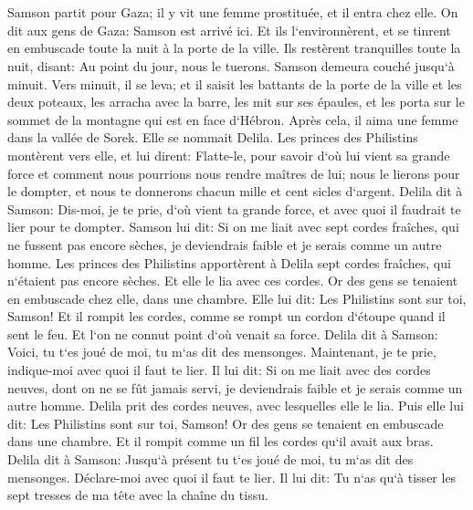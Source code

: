 \chapter{}

\verse Samson partit pour Gaza; il y vit une femme prostituée, et il entra chez elle. 
\verse On dit aux gens de Gaza: Samson est arrivé ici. Et ils l`environnèrent, et se tinrent en embuscade toute la nuit à la porte de la ville. Ils restèrent tranquilles toute la nuit, disant: Au point du jour, nous le tuerons. 
\verse Samson demeura couché jusqu`à minuit. Vers minuit, il se leva; et il saisit les battants de la porte de la ville et les deux poteaux, les arracha avec la barre, les mit sur ses épaules, et les porta sur le sommet de la montagne qui est en face d`Hébron. 
\verse Après cela, il aima une femme dans la vallée de Sorek. Elle se nommait Delila. 
\verse Les princes des Philistins montèrent vers elle, et lui dirent: Flatte-le, pour savoir d`où lui vient sa grande force et comment nous pourrions nous rendre maîtres de lui; nous le lierons pour le dompter, et nous te donnerons chacun mille et cent sicles d`argent. 
\verse Delila dit à Samson: Dis-moi, je te prie, d`où vient ta grande force, et avec quoi il faudrait te lier pour te dompter. 
\verse Samson lui dit: Si on me liait avec sept cordes fraîches, qui ne fussent pas encore sèches, je deviendrais faible et je serais comme un autre homme. 
\verse Les princes des Philistins apportèrent à Delila sept cordes fraîches, qui n`étaient pas encore sèches. Et elle le lia avec ces cordes. 
\verse Or des gens se tenaient en embuscade chez elle, dans une chambre. Elle lui dit: Les Philistins sont sur toi, Samson! Et il rompit les cordes, comme se rompt un cordon d`étoupe quand il sent le feu. Et l`on ne connut point d`où venait sa force. 
\verse Delila dit à Samson: Voici, tu t`es joué de moi, tu m`as dit des mensonges. Maintenant, je te prie, indique-moi avec quoi il faut te lier. 
\verse Il lui dit: Si on me liait avec des cordes neuves, dont on ne se fût jamais servi, je deviendrais faible et je serais comme un autre homme. 
\verse Delila prit des cordes neuves, avec lesquelles elle le lia. Puis elle lui dit: Les Philistins sont sur toi, Samson! Or des gens se tenaient en embuscade dans une chambre. Et il rompit comme un fil les cordes qu`il avait aux bras. 
\verse Delila dit à Samson: Jusqu`à présent tu t`es joué de moi, tu m`as dit des mensonges. Déclare-moi avec quoi il faut te lier. Il lui dit: Tu n`as qu`à tisser les sept tresses de ma tête avec la chaîne du tissu. 
